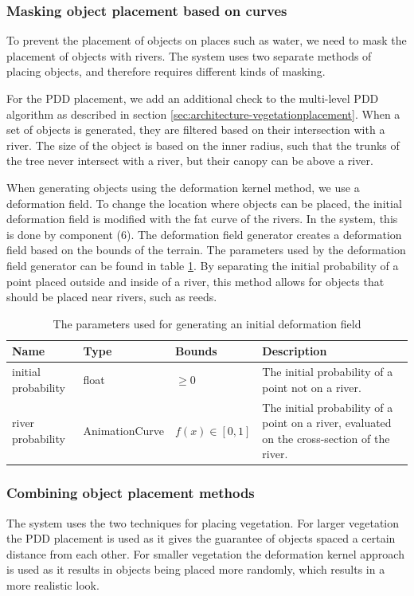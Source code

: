 \subsubsection{Masking object placement based on curves}
To prevent the placement of objects on places such as water, we need to mask the placement of objects with rivers. The system uses two separate methods of placing objects, and therefore requires different kinds of masking.

For the PDD placement, we add an additional check to the multi-level PDD algorithm as described in section \ref{sec:architecture-vegetationplacement}. When a set of objects is generated, they are filtered based on their intersection with a river. The size of the object is based on the inner radius, such that the trunks of the tree never intersect with a river, but their canopy can be above a river.

When generating objects using the deformation kernel method, we use a deformation field. To change the location where objects can be placed, the initial deformation field is modified with the fat curve of the rivers. In the system, this is done by component (6). The deformation field generator creates a deformation field based on the bounds of the terrain. The parameters used by the deformation field generator can be found in table \ref{tab:parameters-deformation-field-generator}.
By separating the initial probability of a point placed outside and inside of a river, this method allows for objects that should be placed near rivers, such as reeds.

\begin{table}[ht]
\begin{tabularx}{\linewidth}{|l|l|l|X|}
\hline
Name & Type & Bounds & Description\\
\hline

initial probability & float & $\geq 0$ & The initial probability of a point not on a river.\\
\hline

river probability & AnimationCurve & $ f(x) \in [0,1] $ & The initial probability of a point on a river, evaluated on the cross-section of the river.\\
\hline

\end{tabularx}
\caption{The parameters used for generating an initial deformation field}
\label{tab:parameters-deformation-field-generator}
\end{table}

\subsubsection{Combining object placement methods}
The system uses the two techniques for placing vegetation. For larger vegetation the PDD placement is used as it gives the guarantee of objects spaced a certain distance from each other. For smaller vegetation the deformation kernel approach is used as it results in objects being placed more randomly, which results in a more realistic look.

